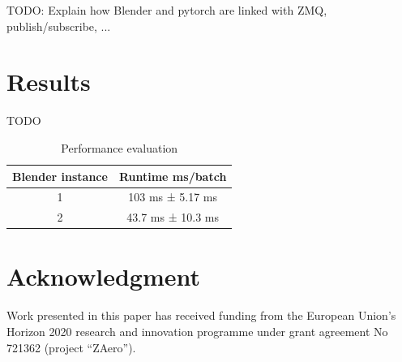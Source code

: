 \documentclass[conference]{IEEEtran}
\begin{document}
TODO: Explain how Blender and pytorch are linked with ZMQ, publish/subscribe, ...

\section{Results}

TODO

\begin{table}[htbp]
\caption{Performance evaluation}
\begin{center}
\begin{tabular}{|c|c|}
\hline
\textbf{Blender instance} & \textbf{Runtime ms/batch} \\
\hline
1 & 103 ms ± 5.17 ms \\
\hline
2 & 43.7 ms ± 10.3 ms \\
\hline
\end{tabular}
\label{tab1}
\end{center}
\end{table}

\section*{Acknowledgment}

Work presented in this paper has received funding from the European Union’s Horizon 2020 research and innovation programme under grant agreement No 721362 (project “ZAero”).

\small





\end{document}
